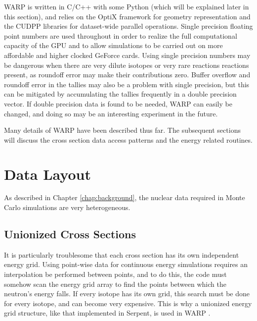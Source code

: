 WARP is written in C/C++ with some Python (which will be explained later in this section), and relies on the OptiX framework for geometry representation and the CUDPP libraries for dataset-wide parallel operations. Single precision floating point numbers are used throughout in order to realize the full computational capacity of the GPU and to allow simulations to be carried out on more affordable and higher clocked GeForce cards.  Using single precision numbers may be dangerous when there are very dilute isotopes or very rare reactions reactions present, as roundoff error may make their contributions zero. %
 Buffer overflow and roundoff error in the tallies may also be a problem with single precision, but this can be mitigated by accumulating the tallies frequently in a double precision vector.  If double precision data is found to be needed, WARP can easily be changed, and doing so may be an interesting experiment in the future.

Many details of WARP have been described thus far. The subsequent sections will discuss the cross section data access patterns and the energy related routines.


\section{Data Layout}

As described in Chapter \ref{chap:background}, the nuclear data required in Monte Carlo simulations are very heterogeneous.

\subsection{Unionized Cross Sections}

It is particularly troublesome that each cross section has its own independent energy grid.  Using point-wise data for continuous energy simulations requires an interpolation be performed between points, and to do this, the code must somehow scan the energy grid array to find the points between which the neutron's energy falls.  If every isotope has its own grid, this search must be done for every isotope, and can become very expensive.  This is why a unionized energy grid structure, like that implemented in Serpent, is used in WARP \cite{jaakko_xs}.


